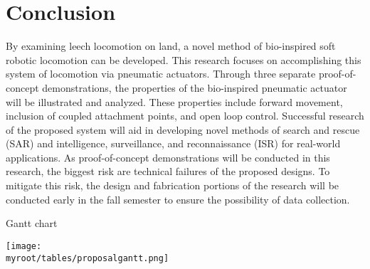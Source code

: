 \documentclass{IEEEtran}
\newcommand{\myroot}{../}
\begin{document}
\section{Conclusion}
By examining leech locomotion on land, a novel method of bio-inspired soft robotic locomotion can be developed. This research focuses on accomplishing this system of locomotion via pneumatic actuators. Through three separate proof-of-concept demonstrations, the properties of the bio-inspired pneumatic actuator will be illustrated and analyzed. These properties include forward movement, inclusion of coupled attachment points, and open loop control. Successful research of the proposed system will aid in developing novel methods of search and rescue (SAR) and intelligence, surveillance, and reconnaissance (ISR) for real-world applications. As proof-of-concept demonstrations will be conducted in this research, the biggest risk are technical failures of the proposed designs. To mitigate this risk, the design and fabrication portions of the research will be conducted early in the fall semester to ensure the possibility of data collection.

\appendix
\begin{table*}
\caption{Gantt chart}
\label{tgantt}
\begin{center}
\texttt{[image: \\myroot/tables/proposalgantt.png]}
\end{center}
\end{table*}





\end{document}
